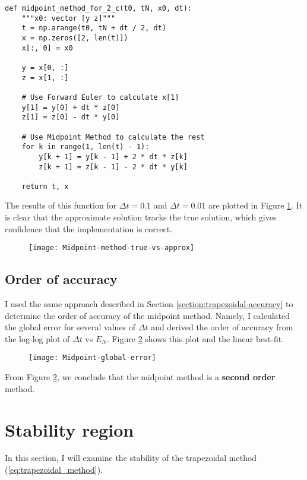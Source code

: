 \documentclass{article}
\begin{document}
\begin{verbatim}
def midpoint_method_for_2_c(t0, tN, x0, dt):
    """x0: vector [y z]"""
    t = np.arange(t0, tN + dt / 2, dt)
    x = np.zeros([2, len(t)])
    x[:, 0] = x0

    y = x[0, :]
    z = x[1, :]

    # Use Forward Euler to calculate x[1]
    y[1] = y[0] + dt * z[0]
    z[1] = z[0] - dt * y[0]

    # Use Midpoint Method to calculate the rest
    for k in range(1, len(t) - 1):
        y[k + 1] = y[k - 1] + 2 * dt * z[k]
        z[k + 1] = z[k - 1] - 2 * dt * y[k]

    return t, x
\end{verbatim}
The results of this function for \(\Delta t = 0.1\) and \(\Delta t = 0.01\) are plotted in Figure \ref{fig:midpoint-approx}. It is clear that the approximate solution tracks the true solution, which gives confidence that the implementation is correct.
\begin{figure}[H]
	\centering
	\texttt{[image: Midpoint-method-true-vs-approx]}
	\caption{}
	\label{fig:midpoint-approx}
\end{figure}
\subsection{Order of accuracy}
I used the same approach described in Section \ref{section:trapezoidal-accuracy} to determine the order of accuracy of the midpoint method.  Namely, I calculated the global error for several values of $\Delta t$ and derived the order of accuracy from the log-log plot of $\Delta t$ vs $E_N$. Figure \ref{fig:midpoint-global-error} shows this plot and the linear best-fit.
\begin{figure}[H]
	\centering
	\texttt{[image: Midpoint-global-error]}
	\caption{}
	\label{fig:midpoint-global-error}
\end{figure}
From Figure \ref{fig:midpoint-global-error}, we conclude that the midpoint method is a \textbf{second order} method.
\section{Stability region}
In this section, I will examine the stability of the trapezoidal method (\ref{eq:trapezoidal_method}).
\end{document}
